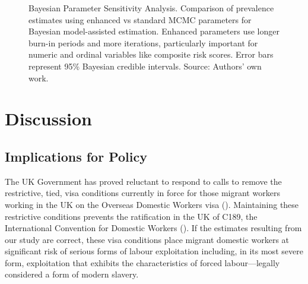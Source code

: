 \documentclass[
  12pt,
  letterpaper,
  DIV=11,
  numbers=noendperiod]{scrartcl}
\theoremstyle{plain}
\theoremstyle{definition}
\begin{document}
\begin{figure}[H]


\caption{\label{fig-parameter-comparison}Bayesian Parameter Sensitivity
Analysis. Comparison of prevalence estimates using enhanced vs standard
MCMC parameters for Bayesian model-assisted estimation. Enhanced
parameters use longer burn-in periods and more iterations, particularly
important for numeric and ordinal variables like composite risk scores.
Error bars represent 95\% Bayesian credible intervals. Source: Authors'
own work.}

\end{figure}%

\section{Discussion}\label{discussion}

\subsection{Implications for Policy}\label{implications-for-policy}

The UK Government has proved reluctant to respond to calls to remove the
restrictive, tied, visa conditions currently in force for those migrant
workers working in the UK on the Overseas Domestic Workers visa
(\textcite{gower_calls_2016}). Maintaining these restrictive conditions
prevents the ratification in the UK of C189, the International
Convention for Domestic Workers (\textcite{ILO11-indicators}). If the
estimates resulting from our study are correct, these visa conditions
place migrant domestic workers at significant risk of serious forms of
labour exploitation including, in its most severe form, exploitation
that exhibits the characteristics of forced labour---legally considered
a form of modern slavery.
\end{document}
